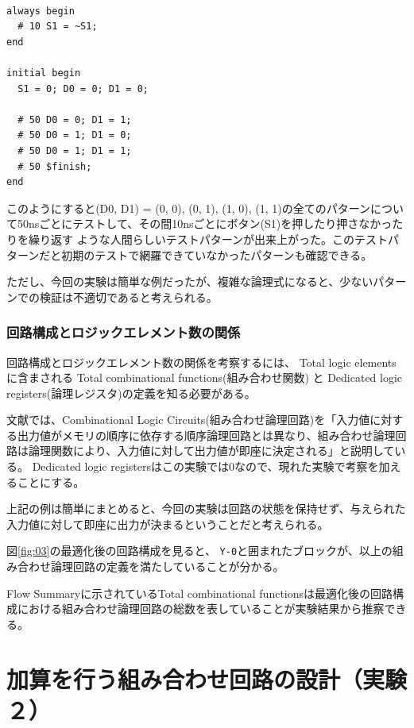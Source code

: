 \documentclass[uplatex]{jsarticle}
\begin{document}
\begin{lstlisting}[basicstyle=\ttfamily\footnotesize, frame=single]

always begin
  # 10 S1 = ~S1;
end

initial begin
  S1 = 0; D0 = 0; D1 = 0;

  # 50 D0 = 0; D1 = 1;
  # 50 D0 = 1; D1 = 0;
  # 50 D0 = 1; D1 = 1;
  # 50 $finish;
end
\end{lstlisting}

このようにすると(D0, D1) = (0, 0), (0, 1), (1, 0), (1, 1)の全てのパターンについて50nsごとにテストして、その間10nsごとにボタン(S1)を押したり押さなかったりを繰り返す
ような人間らしいテストパターンが出来上がった。このテストパターンだと初期のテストで網羅できていなかったパターンも確認できる。

ただし、今回の実験は簡単な例だったが、複雑な論理式になると、少ないパターンでの検証は不適切であると考えられる。

\subsubsection{回路構成とロジックエレメント数の関係}

回路構成とロジックエレメント数の関係を考察するには、 Total logic elements に含まされる Total combinational functions(組み合わせ関数) と Dedicated logic registers(論理レジスタ)の定義を知る必要がある。

文献\cite{et01}では、Combinational Logic Circuits(組み合わせ論理回路)を「入力値に対する出力値がメモリの順序に依存する順序論理回路とは異なり、組み合わせ論理回路は論理関数により、入力値に対して出力値が即座に決定される」と説明している。
Dedicated logic registersはこの実験では0なので、現れた実験で考察を加えることにする。

上記の例は簡単にまとめると、今回の実験は回路の状態を保持せず、与えられた入力値に対して即座に出力が決まるということだと考えられる。

図\ref{fig:03}の最適化後の回路構成を見ると、 {\tt Y-0}と囲まれたブロックが、以上の組み合わせ論理回路の定義を満たしていることが分かる。

Flow Summaryに示されているTotal combinational functionsは最適化後の回路構成における組み合わせ論理回路の総数を表していることが実験結果から推察できる。


\clearpage


\section{加算を行う組み合わせ回路の設計（実験２）}
\end{document}
